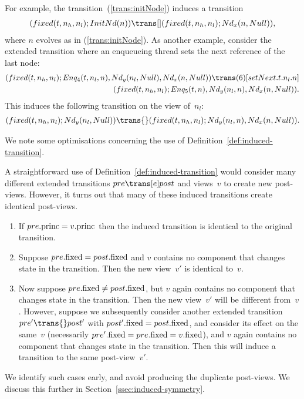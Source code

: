 For example, the  transition~(\ref{trans:initNode}) induces a transition
\[
\begin{align}
(fixed(t, n_h, n_l); \InitNode(n)) \trans[]
  (fixed(t, n_h, n_l); \Node_x(n, Null)),
\end{align}
\]
where $n$ evolves as in (\ref{trans:initNode}).
%
As another example, consider the extended transition where an enqueueing
thread sets the next reference of the last node:
\[
\begin{align}
(fixed(t, n_h, n_l);  Enq_4(t, n_l, n), \Node_y(n_l, Null), \Node_x(n, Null)) 
 \trans(6)[setNext.t.n_l.n] \\
\qquad (fixed(t, n_h, n_l);  Enq_5(t, n), \Node_y(n_l, n), \Node_x(n, Null)).
\end{align}
\]
This induces the following transition on the view of~$n_l$:
\[
\begin{align}
(fixed(t, n_h, n_l);  \Node_y(n_l, Null)) \trans{}  %
  (fixed(t, n_h, n_l);  \Node_y(n_l, n), \Node_x(n, Null)).
\end{align}
\]


We note some optimisations concerning the use of
Definition~\ref{def:induced-transition}.  


%
\begin{opt}
\label{opt:avoid-induced}
A straightforward use of Definition~\ref{def:induced-transition} would
consider many different extended transitions $pre \trans[e] post$ and
views~$v$ to create new post-views.  However, it turns out that many of these
induced transitions create identical post-views.
%
\begin{enumerate}
\item\label{case:avoid-induced-1} If $pre.\mathrm{princ} = v.\mathrm{princ}$ then the induced
  transition is identical to the original transition. 

\item\label{case:avoid-induced-2} Suppose $pre.\mathrm{fixed} = post.\mathrm{fixed}$ and $v$
  contains no component that changes state in the transition.  Then the new
  view~$v'$ is identical to~$v$.

\item\label{case:avoid-induced-3} Now suppose $pre.\mathrm{fixed} \ne post.\mathrm{fixed}$,
  but $v$ again contains no component that changes state in the transition.
  Then the new view~$v'$ will be different from~$v$.  However, suppose we
  subsequently consider another extended transition $pre' \trans{} post'$ with
  $post'.\mathrm{fixed} = post.\mathrm{fixed}$, and consider its effect on the same~$v$
  (necessarily $pre'.\mathrm{fixed} = pre.\mathrm{fixed} = v.\mathrm{fixed}$), and $v$ again contains
  no component that changes state in the transition.  Then this will induce a
  transition to the same post-view~$v'$.
\end{enumerate}
%
We identify such cases early, and avoid producing the duplicate post-views.
We discuss this further in Section~\ref{ssec:induced-symmetry}. 
\end{opt}

